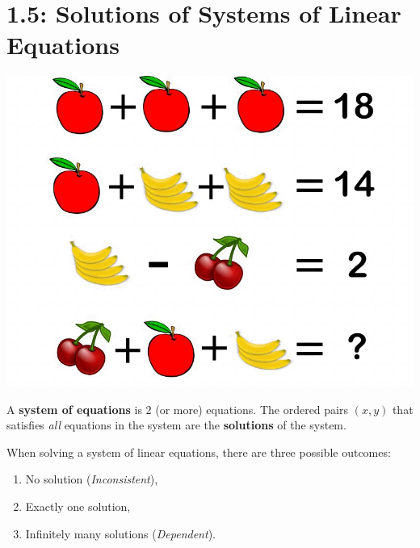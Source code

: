 \documentclass[../mathNotesPreamble]{subfiles}
\begin{document}
  \section{1.5: Solutions of Systems of Linear Equations}
  \begin{center}
    \includegraphics[width=0.65\linewidth]{images/fruit_math_puzzle}
  \end{center}

  \begin{defn*}
    A \textbf{system of equations} is $2$ (or more) equations. The ordered pairs $(x,y)$ that satisfies \emph{all} equations in the system are the \textbf{solutions} of the system.
  \end{defn*}

  When solving a system of linear equations, there are three possible outcomes:
  \begin{center}
    \begin{minipage}{0.5\linewidth}
      \begin{enumerate}
        \item No solution (\emph{Inconsistent}),
        \item Exactly one solution,
        \item Infinitely many solutions (\emph{Dependent}).
      \end{enumerate}
    \end{minipage}
  \end{center}
  \pagebreak
\end{document}
